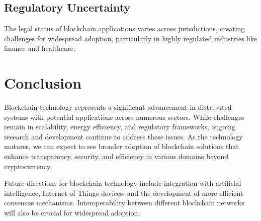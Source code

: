 \documentclass[11pt,a4paper]{article}
\begin{document}
\subsection{Regulatory Uncertainty}
The legal status of blockchain applications varies across jurisdictions, creating challenges for widespread adoption, particularly in highly regulated industries like finance and healthcare.

\section{Conclusion}
Blockchain technology represents a significant advancement in distributed systems with potential applications across numerous sectors. While challenges remain in scalability, energy efficiency, and regulatory frameworks, ongoing research and development continue to address these issues. As the technology matures, we can expect to see broader adoption of blockchain solutions that enhance transparency, security, and efficiency in various domains beyond cryptocurrency.

Future directions for blockchain technology include integration with artificial intelligence, Internet of Things devices, and the development of more efficient consensus mechanisms. Interoperability between different blockchain networks will also be crucial for widespread adoption.



\end{document}
